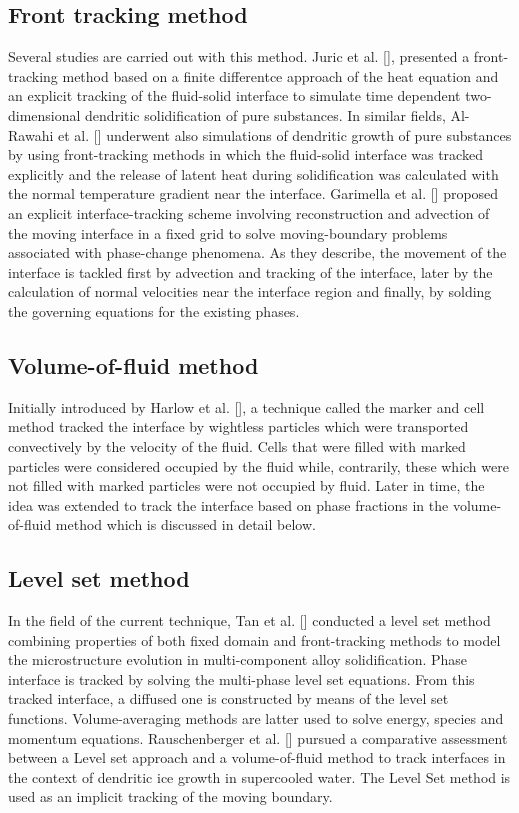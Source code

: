 \subsection{Front tracking method}
Several studies are carried out with this method. Juric et al. [\cite{juric_tryggvason_1996}], presented a front-tracking method based on a finite differentce approach of the heat equation and an explicit tracking of the fluid-solid interface to simulate time dependent two-dimensional dendritic solidification of pure substances. In similar fields, Al-Rawahi et al. [\cite{al-rawahi_tryggvason_2002}] underwent also simulations of dendritic growth of pure substances by using front-tracking methods in which the fluid-solid interface was tracked explicitly and the release of latent heat during solidification was calculated with the normal temperature gradient near the interface. Garimella et al. [\cite{i_garimella_simpson_2003}] proposed an explicit interface-tracking scheme involving reconstruction and advection of the moving interface in a fixed grid to solve moving-boundary problems associated with phase-change phenomena. As they describe, the movement of the interface is tackled first by advection and tracking of the interface, later by the calculation of normal velocities near the interface region and finally, by solding the governing equations for the existing phases.
\subsection*{Volume-of-fluid method}
Initially introduced by Harlow et al. [\cite{harlow_welch_1965}], a technique called the marker and cell method tracked the interface by wightless particles which were transported convectively by the velocity of the fluid. Cells that were filled with marked particles were considered occupied by the fluid while, contrarily, these which were not filled with marked particles were not occupied by fluid. Later in time, the idea was extended to track the interface based on phase fractions in the volume-of-fluid method which is discussed in detail below.
\subsection*{Level set method}
In the field of the current technique, Tan et al. [\cite{tan_zabaras_2007}] conducted a level set method combining properties of both fixed domain and front-tracking methods to model the microstructure evolution in multi-component alloy solidification. Phase interface is tracked by solving the multi-phase level set equations. From this tracked interface, a diffused one is constructed by means of the level set functions. Volume-averaging methods are latter used to solve energy, species and momentum equations.  Rauschenberger et al. [\cite{rauschenberger_criscione_eisenschmidt_kintea_jakirlic_tukovic_roisman_weigand_tropea_2013}] pursued a comparative assessment between a Level set approach and a volume-of-fluid method to track interfaces in the context of dendritic ice growth in supercooled water. The Level Set method is used as an implicit tracking of the moving boundary.
